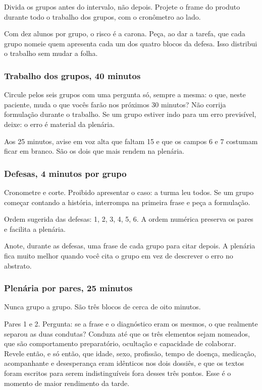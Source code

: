 Divida os grupos antes do intervalo, não depois. Projete o frame do produto durante todo o trabalho dos grupos, com o cronômetro ao lado.

Com dez alunos por grupo, o risco é a carona. Peça, ao dar a tarefa, que cada grupo nomeie quem apresenta cada um dos quatro blocos da defesa. Isso distribui o trabalho sem mudar a folha.

\subsubsection*{Trabalho dos grupos, 40 minutos}

Circule pelos seis grupos com uma pergunta só, sempre a mesma: o que, neste paciente, muda o que vocês farão nos próximos 30 minutos? Não corrija formulação durante o trabalho. Se um grupo estiver indo para um erro previsível, deixe: o erro é material da plenária.

Aos 25 minutos, avise em voz alta que faltam 15 e que os campos 6 e 7 costumam ficar em branco. São os dois que mais rendem na plenária.

\subsubsection*{Defesas, 4 minutos por grupo}

Cronometre e corte. Proibido apresentar o caso: a turma leu todos. Se um grupo começar contando a história, interrompa na primeira frase e peça a formulação.

Ordem sugerida das defesas: 1, 2, 3, 4, 5, 6. A ordem numérica preserva os pares e facilita a plenária.

Anote, durante as defesas, uma frase de cada grupo para citar depois. A plenária fica muito melhor quando você cita o grupo em vez de descrever o erro no abstrato.

\subsubsection*{Plenária por pares, 25 minutos}

Nunca grupo a grupo. São três blocos de cerca de oito minutos.

Pares 1 e 2. Pergunta: se a frase e o diagnóstico eram os mesmos, o que realmente separou as duas condutas? Conduza até que os três elementos sejam nomeados, que são comportamento preparatório, ocultação e capacidade de colaborar. Revele então, e só então, que idade, sexo, profissão, tempo de doença, medicação, acompanhante e desesperança eram idênticos nos dois dossiês, e que os textos foram escritos para serem indistinguíveis fora desses três pontos. Esse é o momento de maior rendimento da tarde.


